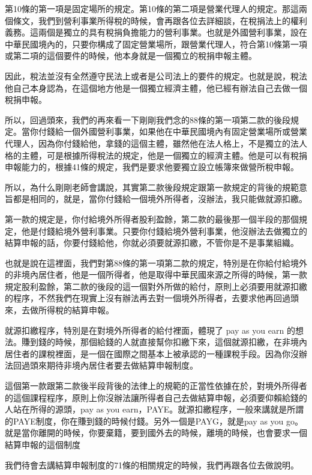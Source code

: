 \documentclass[]{ctexbook}
\begin{document}
第10條的第一項是固定場所的規定。第10條的第二項是營業代理人的規定。那這兩個條文，我們到營利事業所得稅的時候，會再跟各位去詳細談，在稅捐法上的權利義務。這兩個是獨立的具有稅捐負擔能力的營利事業。也就是外國營利事業，設在中華民國境內的，只要你構成了固定營業場所，跟營業代理人，符合第10條第一項或第二項的這個要件的時候，他本身就是一個獨立的稅捐申報主體。

因此，稅法並沒有全然遵守民法上或者是公司法上的要件的規定。也就是說，稅法他自己本身認為，在這個地方他是一個獨立經濟主體，他已經有辦法自己去做一個稅捐申報。

所以，回過頭來，我們的再來看一下剛剛我們念的88條的第一項第二款的後段規定。當你付錢給一個外國營利事業，如果他在中華民國境內有固定營業場所或營業代理人，因為你付錢給他，拿錢的這個主體，雖然他在法人格上，不是獨立的法人格的主體，可是根據所得稅法的規定，他是一個獨立的經濟主體。他是可以有稅捐申報能力的，根據41條的規定，我們是要求他要獨立設立帳簿來做營所稅申報。

所以，為什么剛剛老師會講說，其實第二款後段規定跟第一款規定的背後的規範意旨都是相同的，就是，當你付錢給一個境外所得者，沒辦法，我只能做就源扣繳。

第一款的規定是，你付給境外所得者股利盈餘，第二款的最後那一個半段的那個規定，他是付錢給境外營利事業。只要你付錢給境外營利事業，他沒辦法去做獨立的結算申報的話，你要付錢給他，你就必須要就源扣繳，不管你是不是事業組織。

也就是說在這裡面，我們對第88條的第一項第二款的規定，特別是在你給付給境外的非境內居住者，他是一個所得者，他是取得中華民國來源之所得的時候，第一款規定股利盈餘，第二款的後段的這一個對外所做的給付，原則上必須要用就源扣繳的程序，不然我們在現實上沒有辦法再去對一個境外所得者，去要求他再回過頭來，去做所得稅的結算申報。

就源扣繳程序，特別是在對境外所得者的給付裡面，體現了 pay as you earn 的想法。賺到錢的時候，那個給錢的人就直接幫你扣繳下來，這個就源扣繳，在非境內居住者的課稅裡面，是一個在國際之間基本上被承認的一種課稅手段。因為你沒辦法回過頭來期待非境內居住者要去做結算申報制度。

這個第一款跟第二款後半段背後的法律上的規範的正當性依據在於，對境外所得者的這個課程程序，原則上你沒辦法讓所得者自己去做結算申報，必須要仰賴給錢的人站在所得的源頭，pay as you earn，PAYE。就源扣繳程序，一般來講就是所謂的PAYE制度，你在賺到錢的時候付錢。另外一個是PAYG，就是pay as you go。就是當你離開的時候，你要棄籍，要到國外去的時候，離境的時候，也會要求一個結算申報的這個制度

我們待會去講結算申報制度的71條的相關規定的時候，我們再跟各位去做說明。
\end{document}

